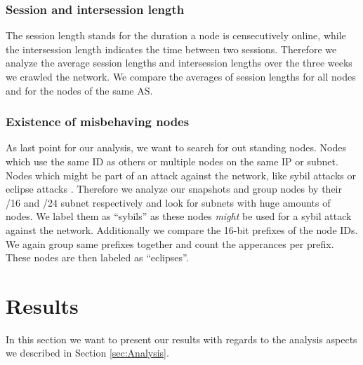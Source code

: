 \documentclass[10pt,conference,final]{IEEEtran}
\begin{document}
\vspace{1mm}

\subsubsection{Session and intersession length}
\label{sec:ASessions}
The session length stands for the duration a node is censecutively online, while the intersession length indicates the time between two sessions.
Therefore we analyze the average session lengths and intersession lengths over the three weeks we crawled the network.
We compare the averages of session lengths for all nodes and for the nodes of the same AS.

\vspace{1mm}

\subsubsection{Existence of misbehaving nodes}
\label{sec:AMisbehavior}
As last point for our analysis, we want to search for out standing nodes.
Nodes which use the same ID as others or multiple nodes on the same IP or subnet.
Nodes which might be part of an attack against the network, like sybil attacks \cite{16} or eclipse attacks \cite{17}.
Therefore we analyze our snapshots and group nodes by their /16 and /24 subnet respectively and look for subnets with huge amounts of nodes.
We label them as ``sybils'' as these nodes \emph{might} be used for a sybil attack against the network.
Additionally we compare the 16-bit prefixes of the node IDs.
We again group same prefixes together and count the apperances per prefix.
These nodes are then labeled as ``eclipses''.

\vspace{1mm}

\section{Results}
\label{sec:Results}
In this section we want to present our results with regards to the analysis aspects we described in Section \ref{sec:Analysis}.

\vspace{2mm}
\end{document}
